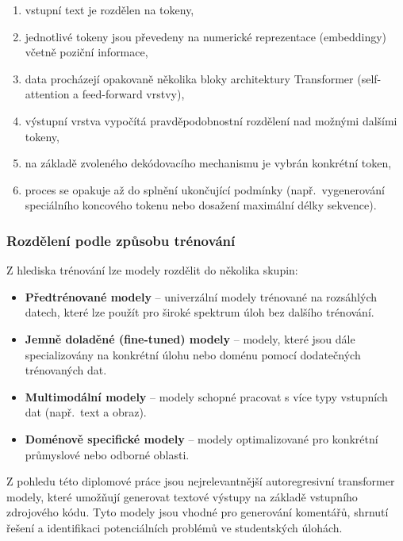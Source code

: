 \begin{enumerate}
    \item vstupní text je rozdělen na tokeny,
    \item jednotlivé tokeny jsou převedeny na numerické reprezentace (embeddingy) včetně poziční informace,
    \item data procházejí opakovaně několika bloky architektury Transformer (self-attention a feed-forward vrstvy),
    \item výstupní vrstva vypočítá pravděpodobnostní rozdělení nad možnými dalšími tokeny,
    \item na základě zvoleného dekódovacího mechanismu je vybrán konkrétní token,
    \item proces se opakuje až do splnění ukončující podmínky (např.\ vygenerování speciálního koncového tokenu nebo dosažení maximální délky sekvence).
\end{enumerate}

\subsubsection*{Rozdělení podle způsobu trénování}
\label{subsubsec:llm-training-types}

Z hlediska trénování lze modely rozdělit do několika skupin:

\begin{itemize}
    \item \textbf{Předtrénované modely} -- univerzální modely trénované na rozsáhlých datech, které lze použít pro široké spektrum úloh bez dalšího trénování.
    \item \textbf{Jemně doladěné (fine-tuned) modely} -- modely, které jsou dále specializovány na konkrétní úlohu nebo doménu pomocí dodatečných trénovaných dat.
    \item \textbf{Multimodální modely} -- modely schopné pracovat s více typy vstupních dat (např.\ text a obraz).
    \item \textbf{Doménově specifické modely} -- modely optimalizované pro konkrétní průmyslové nebo odborné oblasti.
\end{itemize}

Z pohledu této diplomové práce jsou nejrelevantnější autoregresivní transformer modely, které umožňují generovat textové výstupy na základě vstupního zdrojového kódu.
Tyto modely jsou vhodné pro generování komentářů, shrnutí řešení a identifikaci potenciálních problémů ve studentských úlohách.

\endinput